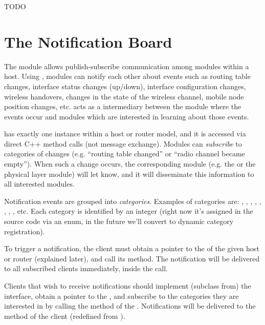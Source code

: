 \iffalse TODO
TODO: Resolving addresses with L3AddressResolver
\fi


\iffalse TODO
\section{The Notification Board}

The  module allows publish-subscribe
communication among modules within a host. Using
, modules can notify each other about
events such as routing table changes, interface status changes
(up/down), interface configuration changes, wireless handovers, changes in
the state of the wireless channel, mobile node position changes, etc.
 acts as a intermediary between the module where
the events occur and modules which are interested in learning about
those events.

 has exactly one instance within a host or
router model, and it is accessed via direct C++ method calls (not message
exchange). Modules can \textit{subscribe} to categories of changes
(e.g. ``routing table changed'' or ``radio channel became empty''). When
such a change occurs, the corresponding module (e.g. the
 or the physical layer module) will let
 know, and it will disseminate this information
to all interested modules.

\sloppypar Notification events are grouped into \textit{categories}.
Examples of categories are: ,
, ,
, ,
, , ,
etc. Each category is identified by an integer (right now it's assigned in
the source code via an enum, in the future we'll convert to dynamic
category registration).

To trigger a notification, the client must obtain a pointer to the
 of the given host or router (explained later),
and call its  method. The notification will
be delivered to all subscribed clients immediately, inside the
 call.

Clients that wish to receive notifications should implement (subclass from)
the  interface, obtain a pointer to the
, and subscribe to the categories they are
interested in by calling the  method of the
. Notifications will be delivered to the
 method of the client (redefined from
).

